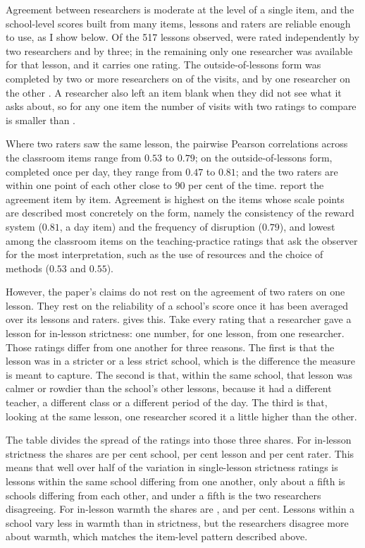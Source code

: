 Agreement between researchers is moderate at the level of a single item, and
the school-level scores built from many items, lessons and raters are
reliable enough to use, as I show below. Of the 517 lessons observed,
\LessonsTwoRaters{} were rated independently by two researchers and
\LessonsThreeRaters{} by three; in the remaining \LessonsOneRater{} only one
researcher was available for that lesson, and it carries one rating. The
outside-of-lessons form was completed by two or more researchers on
\DaysTwoPlusRaters{} of the \NTierOne{} visits, and by one researcher on
the other \DaysOneRater{}. A researcher also left an item blank when they
did not see what it asks about, so for any one item the number of visits
with two ratings to compare is smaller than \DaysTwoPlusRaters{}.

Where two raters saw the
same lesson, the pairwise Pearson correlations across the classroom items
range from $0.53$ to $0.79$; on the outside-of-lessons form, completed once
per day, they range from $0.47$ to $0.81$; and the two raters are within one point of each other close to 90 per cent of the time.  report the agreement item by item. Agreement is highest on the
items whose scale points are described most concretely on the form, namely the consistency of the reward
system ($0.81$, a day item) and the frequency of disruption ($0.79$), and
lowest among the classroom items on the teaching-practice ratings that ask
the observer for the most interpretation, such as the use of resources and
the choice of methods ($0.53$ and $0.55$).

However, the paper's claims do not rest on the agreement of two raters on
one lesson. They rest on the reliability of a school's score once it has
been averaged over its lessons and raters.  gives this. Take
every rating that a
researcher gave a lesson for in-lesson strictness: one number, for one
lesson, from one researcher. Those ratings differ from one another for three
reasons. The first is that the lesson was in a stricter or a less strict
school, which is the difference the measure is meant to capture. The second
is that, within the same school, that lesson was calmer or rowdier than the
school's other lessons, because it had a different teacher, a different
class or a different period of the day. The third is that, looking at the
same lesson, one researcher scored it a little higher than the other.

The table divides the spread of the ratings into those three shares. For
in-lesson strictness the shares are \ShareSchoolS{} per cent school,
\ShareLessonS{} per cent lesson and \ShareRaterS{} per cent rater. This means
that well over half of the variation in single-lesson strictness ratings is
lessons within the same school differing from one another, only about a
fifth is schools differing from each other, and under a fifth is the two
researchers disagreeing. For in-lesson warmth the shares are
\ShareSchoolW{}, \ShareLessonW{} and \ShareRaterW{} per cent. Lessons within
a school vary less in warmth than in strictness, but the researchers
disagree more about warmth, which matches the item-level pattern described
above.

